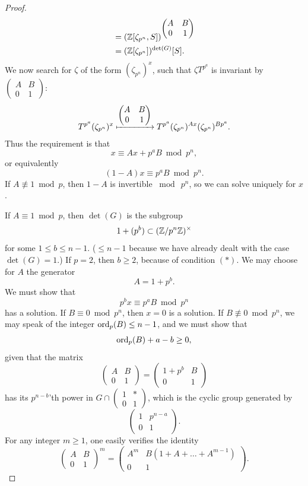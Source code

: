 \begin{proof}
\begin{align*}
&= (\mathbb{Z}[\zeta_{p^n}, S])^{\begin{pmatrix} A & B \\ 0 & 1 \end{pmatrix}} \\
&= (\mathbb{Z}[\zeta_{p^n}])^{\det(G)}[S] .
\end{align*}
We now search for $\zeta$ of the form $(\zeta_{p^n})^x$, such that $\zeta T^{p^a}$ is invariant by $\begin{pmatrix} A & B \\ 0 & 1 \end{pmatrix}$:
\[
T^{p^a}(\zeta_{p^n})^x \xmapsto{\begin{pmatrix} A & B \\ 0 & 1 \end{pmatrix}} T^{p^a}(\zeta_{p^n})^{Ax}(\zeta_{p^n})^{Bp^a} .
\]
Thus the requirement is that
\[
x \equiv Ax + p^a B \bmod p^n ,
\]
or equivalently
\[
(1 - A)x \equiv p^a B \bmod p^n .
\]
If $A \not\equiv 1 \bmod p$, then $1 - A$ is invertible $\bmod\ p^n$, so we can solve uniquely for $x$.
\par
If $A \equiv 1 \bmod p$, then $\det(G)$ is the subgroup
\[
1 + (p^b) \subset (\mathbb{Z}/p^n\mathbb{Z})^\times
\]
for some $1 \le b \le n-1$. ($\le n-1$ because we have already dealt with the case $\det(G) = 1$.) If $p = 2$, then $b \ge 2$, because of condition $(*)$. We may choose for $A$ the generator
\[
A = 1 + p^b .
\]
We must show that
\[
p^b x \equiv p^a B \bmod p^n
\]
has a solution. If $B \equiv 0 \bmod p^n$, then $x = 0$ is a solution. If $B \not\equiv 0 \bmod p^n$, we may speak of the integer $\operatorname{ord}_p(B) \le n-1$, and we must show that
\[
\operatorname{ord}_p(B) + a - b \ge 0 ,
\]
given that the matrix
\[
\begin{pmatrix} A & B \\ 0 & 1 \end{pmatrix} = \begin{pmatrix} 1 + p^b & B \\ 0 & 1 \end{pmatrix}
\]
has its $p^{n-b}$'th power in $G \cap \begin{pmatrix} 1 & * \\ 0 & 1 \end{pmatrix}$, which is the cyclic group generated by
\[
\begin{pmatrix} 1 & p^{n-a} \\ 0 & 1 \end{pmatrix} .
\]
For any integer $m \ge 1$, one easily verifies the identity
\[
\begin{pmatrix} A & B \\ 0 & 1 \end{pmatrix}^m = \begin{pmatrix} A^m & B(1 + A + \dots + A^{m-1}) \\ 0 & 1 \end{pmatrix} .
\]
\end{proof}

